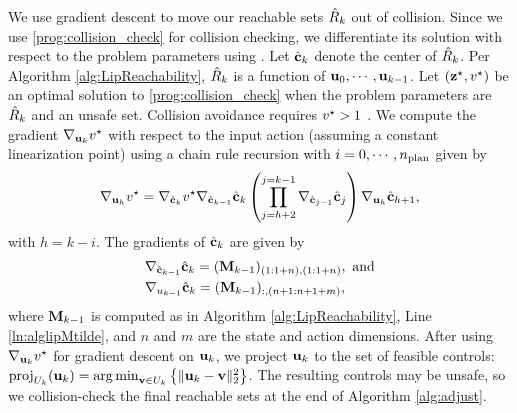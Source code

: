 We use gradient descent to move our reachable sets ${\hat{R}}_k$ out of collision.
Since we use \eqref{prog:collision_check} for collision checking, we differentiate its solution with respect to the problem parameters using \cite{amos2017optnet,chung2021constrained}.
Let $\hat{{\mathbf{c}}}_k$ denote the center of ${\hat{R}}_k$.
Per Algorithm \ref{alg:LipReachability}, ${\hat{R}}_k$ is a function of ${\mathbf{u}}_0,\cdots,{\mathbf{u}}_{k-1}$.
Let $({\mathbf{z}}^\star,v^\star)$ be an optimal solution to \eqref{prog:collision_check} when the problem parameters  are ${\hat{R}}_k$ and an unsafe set.
Collision avoidance requires $v^\star > 1$ \cite[Prop. 2]{conf:const_zono}.
We compute the gradient $\nabla_{{\mathbf{u}}_k} v^\star$ with respect to the input action (assuming a constant linearization point) using a chain rule recursion with $i = 0,\cdots,{n_{\mathrm{\textnormal{plan}}}}$ given by
\begin{align}\label{eq:collision_chain_rule}
    \nabla_{{\mathbf{u}}_{h}} v^\star = \nabla_{\hat{{\mathbf{c}}}_k} v^\star
        \nabla_{\hat{{\mathbf{c}}}_{k - 1}} \hat{{\mathbf{c}}}_k
        \left(\prod_{j=h + 2}^{j = k - 1} \nabla_{\hat{{\mathbf{c}}}_{j - 1}} \hat{{\mathbf{c}}}_j\right) 
         \nabla_{{\mathbf{u}}_{h}}  \hat{{\mathbf{c}}}_{h + 1},
\end{align}
with $h = k - i$.
The gradients of $\hat{{\mathbf{c}}}_k$ are given by
\begin{subequations}
\begin{align}
    &\nabla_{\hat{{\mathbf{c}}}_{k - 1}} \hat{{\mathbf{c}}}_k = ({\mathbf{M}}_{k - 1})_{(1:1+n),(1:1+n)},\ \mathrm{\textnormal{and}}
    \label{eq:collision_chain_rule_for_input_zono1} \\
    &\nabla_{u_{k - 1}} \hat{{\mathbf{c}}}_k = ({\mathbf{M}}_{k-1})_{:,(n+1:n+1+m)},
    \label{eq:collision_chain_rule_for_input_zono2}
\end{align}
\end{subequations}
where ${\mathbf{M}}_{k-1}$ is computed as in Algorithm \ref{alg:LipReachability}, Line \ref{ln:alglipMtilde}, and $n$ and $m$ are the state and action dimensions. 
After using  $\nabla_{{\mathbf{u}}_k}v^\star$ for gradient descent on ${\mathbf{u}}_k$, we project ${\mathbf{u}}_k$ to the set of feasible controls: $\mathrm{\textnormal{proj}}_{U_k}({\mathbf{u}}_k) = \operatorname*{arg\,min}_{{\mathbf{v}} \in U_k} \left\{\lVert{\mathbf{u}}_k - {\mathbf{v}}\rVert_2^2\right\}$.
The resulting controls may be unsafe, so we collision-check the final reachable sets at the end of Algorithm \ref{alg:adjust}.

